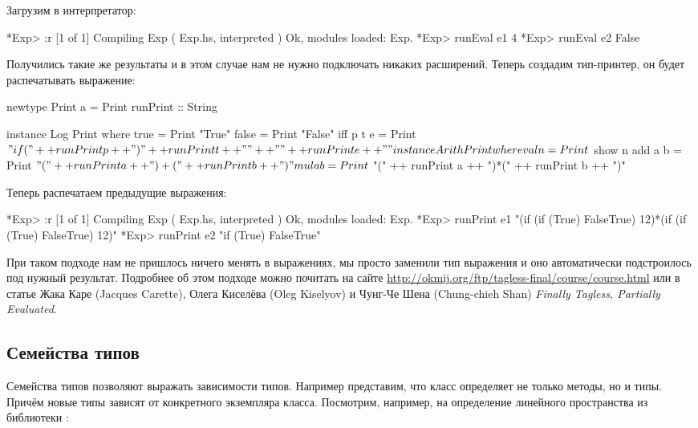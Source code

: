 Загрузим в интерпретатор:


\begin{code}
*Exp> :r
[1 of 1] Compiling Exp              ( Exp.hs, interpreted )
Ok, modules loaded: Exp.
*Exp> runEval e1
4
*Exp> runEval e2
False
\end{code}

Получились такие же результаты и в этом случае нам не нужно подключать
никаких расширений. Теперь создадим тип-принтер, он будет распечатывать
выражение:


\begin{code}
newtype Print a = Print { runPrint :: String }

instance Log Print where
    true    = Print "True" 
    false   = Print "False"
    iff p t e = Print $ "if (" ++ runPrint p ++ ") {" 
            ++ runPrint t ++ "}"
            ++ "{" ++ runPrint e ++ "}"

instance Arith Print where
    val n   = Print $ show n
    add a b = Print $ "(" ++ runPrint a ++ ")+(" ++ runPrint b ++ ")"
    mul a b = Print $ "(" ++ runPrint a ++ ")*(" ++ runPrint b ++ ")"
\end{code}

Теперь распечатаем предыдущие выражения:


\begin{code}
*Exp> :r
[1 of 1] Compiling Exp              ( Exp.hs, interpreted )
Ok, modules loaded: Exp.
*Exp> runPrint e1
"(if (if (True) {False}{True}) {1}{2})*(if (if (True) {False}{True}) {1}{2})"
*Exp> runPrint e2
"if (True) {False}{True}"
\end{code}

При таком подходе нам не пришлось ничего менять в выражениях, мы просто
заменили тип выражения и оно автоматически подстроилось под нужный
результат. Подробнее об этом подходе можно почитать на сайте
\url{http://okmij.org/ftp/tagless-final/course/course.html} или в статье
Жака Каре (Jacques Carette), Олега Киселёва (Oleg Kiselyov) и Чунг-Че
Шена (Chung-chieh Shan) \emph{Finally Tagless, Partially Evaluated}.

\subsection{Семейства типов}

  Семейства типов
позволяют выражать зависимости типов. Например представим, что класс
определяет не только методы, но и типы. Причём новые типы зависят от
конкретного экземпляра класса. Посмотрим, например, на определение
линейного пространства из библиотеки :


